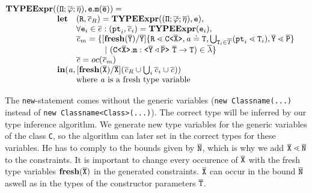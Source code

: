 \documentclass[a4paper,USenglish,cleveref, autoref, thm-restate]{lipics-v2021}
\begin{document}
\noindent
$\begin{array}{@{}l@{}l}
\typeExpr{} & (\typeAssumptions, \texttt{e}.\mathtt{m}(\overline{\texttt{e}}) ) = \\
& \begin{array}{ll}
\textbf{let}& %
(\type{R}, \constraints_R) = \typeExpr(\typeAssumptions, \texttt{e}),\\
& \forall \texttt{e}_i \in \overline{e} : (\type{pt}_i, \constraints_i) = \typeExpr(\texttt{e}_i)  ,\\
& \begin{array}{@{}l@{}l}
  \constraints_{m} = \set{ & [\textbf{fresh}(\ol{Y})/\ol{Y}]\set{\type{R} \lessdot \exptype{C}{\ol{X}}, \tv{a} \doteq \type{T}, \bigcup_{\type{T}_i \in \overline{T}} (\type{pt}_i \lessdot \type{T}_i) , \ol{Y} \lessdot \ol{P}}\\
  & \ |\ (\exptype{C}{\ol{X}}.\texttt{m} : \exptype{}{\ol{Y} \triangleleft \ol{P}} \ \ol{T} \to \type{T}) \in \overline{\methodAssumption} }
\end{array}\\
& \constraints = \orCons(\constraints_{m})\\
\multicolumn{2}{l}{\mathbf{in} (\tv{a}, [\textbf{fresh}(\ol{X})/\ol{X}](\constraints_R \cup \bigcup_i \constraints_i \cup \constraints))}\\
& \text{where\ } \tv{a} \text{\ is\ a\ fresh\
  type\ variable}\\ 
\end{array}
\end{array}
$


\smallskip

The \texttt{new}-statement comes without the generic variables
(\texttt{new Classname(...)} instead of \texttt{new Classname<Class>(...)}).
The correct type will be inferred by our type inference algorithm.
We generate new type variables for the generic variables of the class \texttt{C},
so the \unify algorithm can later set in the correct types for these variables.
He has to comply to the bounds given by $\overline{\tt N}$, which is why we add $\overline{\tt X} \lessdot \overline{\tt N}$ to the constraints.
It is important to change every occurence of $\overline{\tt X}$ with the fresh type variables $\textbf{fresh}(\overline{\tt X})$ in the generated constraints.
$\overline{\tt X}$ can occur in the bound $\overline{\tt N}$ aswell as in the types of the constructor parameters $\overline{\tt T}$.
\end{document}
